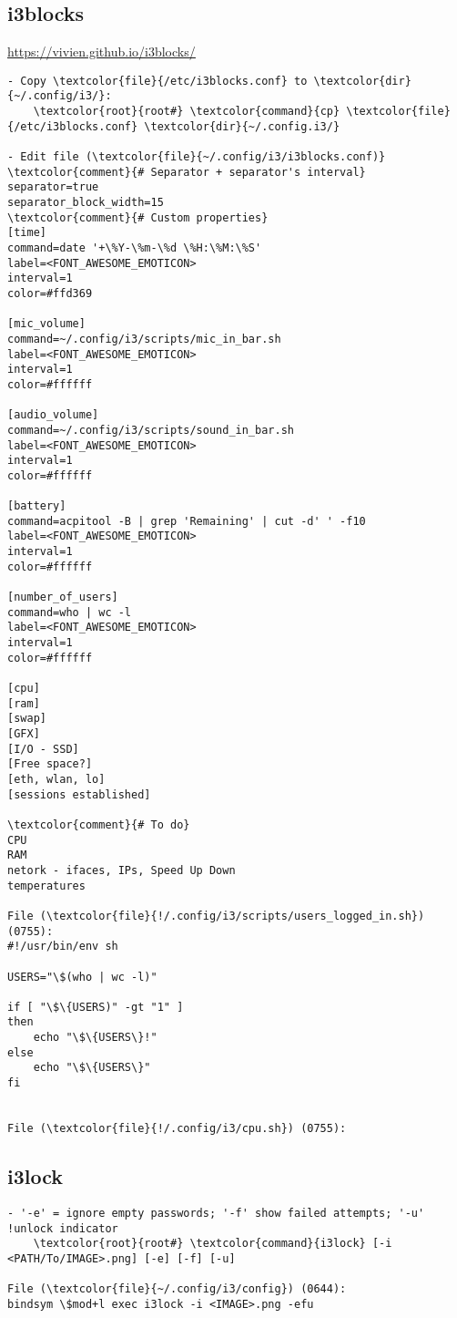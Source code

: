 \documentclass[10pt, a4paper, onecolumn, openany]{book}         %
\begin{document}
\subsection{i3blocks}
\underline{\url{https://vivien.github.io/i3blocks/}}
\begin{Verbatim}[commandchars=\\\{\}]
- Copy \textcolor{file}{/etc/i3blocks.conf} to \textcolor{dir}{~/.config/i3/}:
    \textcolor{root}{root#} \textcolor{command}{cp} \textcolor{file}{/etc/i3blocks.conf} \textcolor{dir}{~/.config.i3/}

- Edit file (\textcolor{file}{~/.config/i3/i3blocks.conf)}
\textcolor{comment}{# Separator + separator's interval}
separator=true
separator_block_width=15
\textcolor{comment}{# Custom properties}
[time]
command=date '+\%Y-\%m-\%d \%H:\%M:\%S'
label=<FONT_AWESOME_EMOTICON>
interval=1
color=#ffd369

[mic_volume]
command=~/.config/i3/scripts/mic_in_bar.sh
label=<FONT_AWESOME_EMOTICON>
interval=1
color=#ffffff

[audio_volume]
command=~/.config/i3/scripts/sound_in_bar.sh
label=<FONT_AWESOME_EMOTICON>
interval=1
color=#ffffff

[battery]
command=acpitool -B | grep 'Remaining' | cut -d' ' -f10
label=<FONT_AWESOME_EMOTICON>
interval=1
color=#ffffff

[number_of_users]
command=who | wc -l
label=<FONT_AWESOME_EMOTICON>
interval=1
color=#ffffff

[cpu]
[ram]
[swap]
[GFX]
[I/O - SSD]
[Free space?]
[eth, wlan, lo]
[sessions established]

\textcolor{comment}{# To do}
CPU
RAM
netork - ifaces, IPs, Speed Up Down
temperatures

File (\textcolor{file}{!/.config/i3/scripts/users_logged_in.sh}) (0755):
#!/usr/bin/env sh

USERS="\$(who | wc -l)"

if [ "\$\{USERS)" -gt "1" ]
then
    echo "\$\{USERS\}!"
else
    echo "\$\{USERS\}"
fi


File (\textcolor{file}{!/.config/i3/cpu.sh}) (0755):

\end{Verbatim}

\subsection{i3lock}
\begin{Verbatim}[commandchars=\\\{\}]
- '-e' = ignore empty passwords; '-f' show failed attempts; '-u' !unlock indicator
    \textcolor{root}{root#} \textcolor{command}{i3lock} [-i <PATH/To/IMAGE>.png] [-e] [-f] [-u]
    
File (\textcolor{file}{~/.config/i3/config}) (0644):
bindsym \$mod+l exec i3lock -i <IMAGE>.png -efu
\end{Verbatim}
\end{document}
